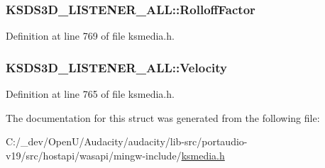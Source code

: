 \subsubsection[{\texorpdfstring{Rolloff\+Factor}{RolloffFactor}}]{ K\+S\+D\+S3\+D\+\_\+\+L\+I\+S\+T\+E\+N\+E\+R\+\_\+\+A\+L\+L\+::\+Rolloff\+Factor}\hypertarget{struct_k_s_d_s3_d___l_i_s_t_e_n_e_r___a_l_l_a484ae9eeba662e8015774dd3810de8a3}{}\label{struct_k_s_d_s3_d___l_i_s_t_e_n_e_r___a_l_l_a484ae9eeba662e8015774dd3810de8a3}


Definition at line 769 of file ksmedia.\+h.

\subsubsection[{\texorpdfstring{Velocity}{Velocity}}]{ K\+S\+D\+S3\+D\+\_\+\+L\+I\+S\+T\+E\+N\+E\+R\+\_\+\+A\+L\+L\+::\+Velocity}\hypertarget{struct_k_s_d_s3_d___l_i_s_t_e_n_e_r___a_l_l_a0bb3930a016c6fdbc3f1790c63afc4f1}{}\label{struct_k_s_d_s3_d___l_i_s_t_e_n_e_r___a_l_l_a0bb3930a016c6fdbc3f1790c63afc4f1}


Definition at line 765 of file ksmedia.\+h.



The documentation for this struct was generated from the following file\+:\begin{DoxyCompactItemize}
\item 
C\+:/\+\_\+dev/\+Open\+U/\+Audacity/audacity/lib-\/src/portaudio-\/v19/src/hostapi/wasapi/mingw-\/include/\hyperlink{ksmedia_8h}{ksmedia.\+h}\end{DoxyCompactItemize}
